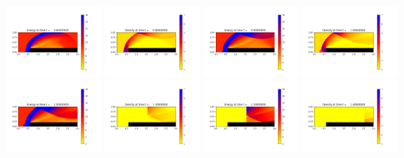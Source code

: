 \documentclass[11pt]{article}
\begin{document}
\includegraphics[width=0.2375\textwidth]{frame0003fig2.png}
\vskip 10pt 
\includegraphics[width=0.2375\textwidth]{frame0004fig0.png}
\includegraphics[width=0.2375\textwidth]{frame0004fig2.png}
\includegraphics[width=0.2375\textwidth]{frame0005fig0.png}
\includegraphics[width=0.2375\textwidth]{frame0005fig2.png}
\vskip 10pt 
\includegraphics[width=0.2375\textwidth]{frame0006fig0.png}
\includegraphics[width=0.2375\textwidth]{frame0006fig2.png}
\includegraphics[width=0.2375\textwidth]{frame0007fig0.png}
\end{document}
